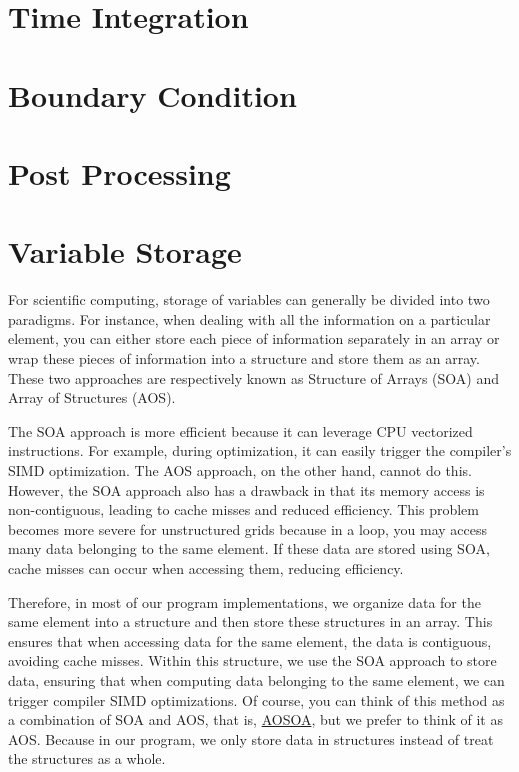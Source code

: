 \documentclass{develop-note}
\begin{document}
\section{Time Integration}


\section{Boundary Condition}


\section{Post Processing}


\section{Variable Storage}


For scientific computing, storage of variables can generally be divided into two paradigms. For instance, when dealing with all the information on a particular element, you can either store each piece of information separately in an array or wrap these pieces of information into a structure and store them as an array. These two approaches are respectively known as Structure of Arrays (SOA) and Array of Structures (AOS).

The SOA approach is more efficient because it can leverage CPU vectorized instructions. For example, during optimization, it can easily trigger the compiler's SIMD optimization. The AOS approach, on the other hand, cannot do this. However, the SOA approach also has a drawback in that its memory access is non-contiguous, leading to cache misses and reduced efficiency. This problem becomes more severe for unstructured grids because in a loop, you may access many data belonging to the same element. If these data are stored using SOA, cache misses can occur when accessing them, reducing efficiency.

Therefore, in most of our program implementations, we organize data for the same element into a structure and then store these structures in an array. This ensures that when accessing data for the same element, the data is contiguous, avoiding cache misses. Within this structure, we use the SOA approach to store data, ensuring that when computing data belonging to the same element, we can trigger compiler SIMD optimizations. Of course, you can think of this method as a combination of SOA and AOS, that is, \href{https://en.wikipedia.org/wiki/AoS_and_SoA}{AOSOA}, but we prefer to think of it as AOS. Because in our program, we only store data in structures instead of treat the structures as a whole.
\end{document}
